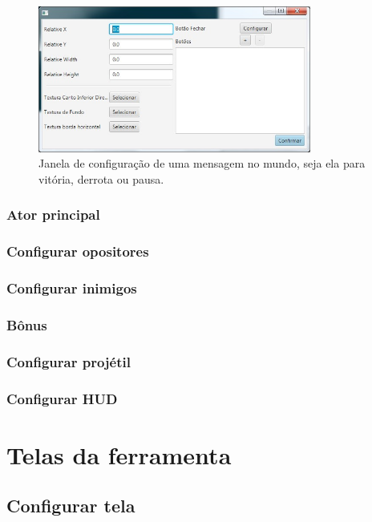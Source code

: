 \documentclass[12pt,twoside,openright,a4paper,english,brazil,sumario=tradicional]{abntex2}
\begin{document}
\begin{anexosenv}
   \begin{figure}[h]
   \centering
   \includegraphics[width=0.8\textwidth]{images/config_msg.jpg}
   \caption{Janela de configuração de uma mensagem no mundo, seja ela para vitória, derrota ou pausa.}
   \label{fig:config_msg}
   \end{figure}

   \subsubsection{Ator principal}


   \subsubsection{Configurar opositores}


   \subsubsection{Configurar inimigos}


   \subsubsection{Bônus}


   \subsubsection{Configurar projétil}


   \subsubsection{Configurar HUD}


   \section{Telas da ferramenta}


   \subsection{Configurar tela}



\end{anexosenv}
\end{document}
